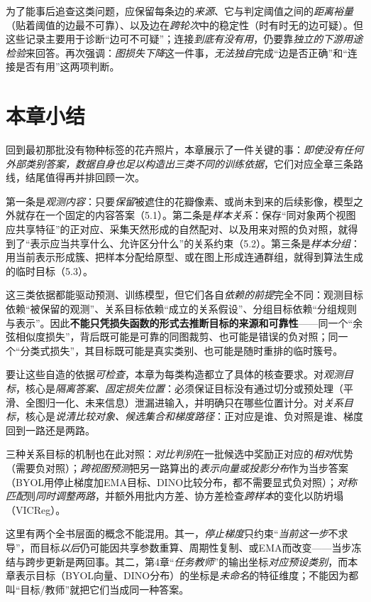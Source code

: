 为了能事后追查这类问题，应保留每条边的\emph{来源}、它与判定阈值之间的\emph{距离裕量}（贴着阈值的边最不可靠）、以及边在\emph{跨轮次}中的稳定性（时有时无的边可疑）。但这些记录主要用于诊断“边可不可疑”；连接\emph{到底有没有用}，仍要靠\emph{独立的下游用途检验}来回答。再次强调：\emph{图损失下降}这一件事，\emph{无法独自}完成“边是否正确”和“连接是否有用”这两项判断。

\section{本章小结}
\label{sec:data-derived-knowledge-summary}

回到最初那批没有物种标签的花卉照片，本章展示了一件关键的事：\emph{即使没有任何外部类别答案，数据自身也足以构造出三类不同的训练依据}，它们对应全章三条路线，结尾值得再并排回顾一次。

第一条是\emph{观测内容}：只要\emph{保留}被遮住的花瓣像素、或尚未到来的后续影像，模型之外就存在一个固定的内容答案（5.1）。第二条是\emph{样本关系}：保存“同对象两个视图应共享特征”的正对应、采集天然形成的自然配对、以及用来对照的负对照，就得到了“表示应当共享什么、允许区分什么”的关系约束（5.2）。第三条是\emph{样本分组}：用当前表示形成簇、把样本分配给原型、或在图上形成连通群组，就得到算法生成的临时目标（5.3）。

这三类依据都能驱动预测、训练模型，但它们各自\emph{依赖的前提}完全不同：观测目标依赖“被保留的观测”、关系目标依赖“成立的关系假设”、分组目标依赖“分组规则与表示”。因此\textbf{不能只凭损失函数的形式去推断目标的来源和可靠性}——同一个“余弦相似度损失”，背后既可能是可靠的同图裁剪、也可能是错误的负对照；同一个“分类式损失”，其目标既可能是真实类别、也可能是随时重排的临时簇号。

要让这些自造的依据\emph{可检查}，本章为每类构造都立了具体的核查要求。对\emph{观测目标}，核心是\emph{隔离答案、固定损失位置}：必须保证目标没有通过切分或预处理（平滑、全图归一化、未来信息）泄漏进输入，并明确只在哪些位置计分。对\emph{关系目标}，核心是\emph{说清比较对象、候选集合和梯度路径}：正对应是谁、负对照是谁、梯度回到一路还是两路。

三种关系目标的机制也在此对照：\emph{对比判别}在一批候选中奖励正对应的\emph{相对}优势（需要负对照）；\emph{跨视图预测}把另一路算出的\emph{表示向量或投影分布}作为当步答案（BYOL用停止梯度加EMA目标、DINO比较分布，都不需要显式负对照）；\emph{对称匹配}则\emph{同时调整两路}，并额外用批内方差、协方差检查\emph{跨样本}的变化以防坍塌（VICReg）。

这里有两个全书层面的概念不能混用。其一，\emph{停止梯度}只约束“\emph{当前这一步}不求导”，而目标\emph{以后}仍可能因共享参数重算、周期性复制、或EMA而改变——当步冻结与跨步更新是两回事。其二，第4章“\emph{任务教师}”的输出坐标\emph{对应预设类别}，而本章表示目标（BYOL向量、DINO分布）的坐标是\emph{未命名}的特征维度；不能因为都叫“目标/教师”就把它们当成同一种答案。

